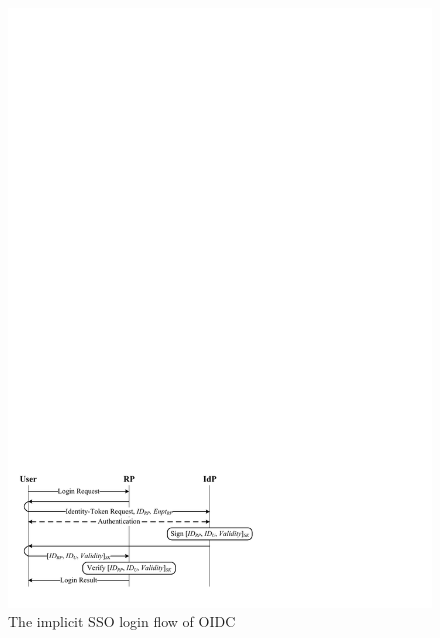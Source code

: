 \begin{figure}[t]
  \centering
  \includegraphics[width=0.98\linewidth]{fig/OIDC1.pdf}
  \caption{The implicit SSO login flow of OIDC}
  \label{fig:OpenID}
\end{figure}

